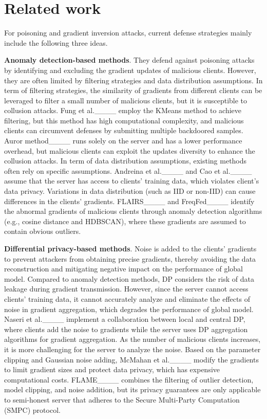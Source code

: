 \section{Related work}
\label{re}
For poisoning and gradient inversion attacks, current defense strategies mainly include the following three ideas.  

\textbf{Anomaly detection-based methods}. They defend against poisoning attacks by identifying and excluding the gradient updates of malicious clients. However, they are often limited by filtering strategies and data distribution assumptions. In term of filtering strategies, the similarity of gradients from different clients can be leveraged to filter a small number of malicious clients, but it is susceptible to collusion attacks. Fung et al.____ employ the KMeans method to achieve filtering, but this method has high computational complexity, and malicious clients can circumvent defenses by submitting multiple backdoored samples. Auror method____ runs solely on the server and has a lower performance overhead, but malicious clients can exploit the updates diversity to enhance the collusion attacks. In term of data distribution assumptions, existing methods often rely on specific assumptions. Andreina et al.____ and Cao et al.____ assume that the server has access to clients' training data, which violates client's data privacy. Variations in data distribution (such as IID or non-IID) can cause differences in the clients' gradients. FLAIRS____ and FreqFed____ identify the abnormal gradients of malicious clients through anomaly detection algorithms (e.g., cosine distance and HDBSCAN), where these gradients are assumed to contain obvious outliers. 

\textbf{Differential privacy-based methods}. Noise is added to the clients' gradients to prevent attackers from obtaining precise gradients, thereby avoiding the data reconstruction and mitigating negative impact on the performance of global model. Compared to anomaly detection methods, DP considers the risk of data leakage during gradient transmission. However, since the server cannot access clients' training data, it cannot accurately analyze and eliminate the effects of noise in gradient aggregation, which degrades the performance of global model. Naseri et al.____ implement a collaboration between local and central DP, where clients add the noise to gradients while the server uses DP aggregation algorithms for gradient aggregation. As the number of malicious clients increases, it is more challenging for the server to analyze the noise. Based on the parameter clipping and Gaussian noise adding, McMahan et al.____ modify the gradients to limit gradient sizes and protect data privacy, which has expensive computational costs. FLAME____ combines the filtering of outlier detection, model clipping, and noise addition, but its privacy guarantees are only applicable to semi-honest server that adheres to the Secure Multi-Party Computation (SMPC) protocol.

